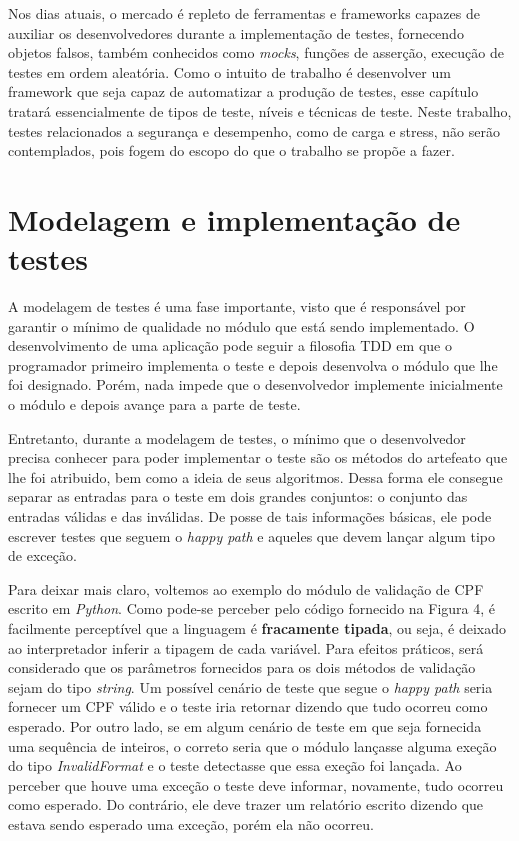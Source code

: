 \documentclass[
    12pt,       %
    openright,      %
    twoside,      %
    a4paper,      %
    english,      %
    french,       %
    spanish,      %
    brazil,       %
    ]{abntex2}
\begin{document}
      Nos dias atuais, o mercado é repleto de ferramentas e frameworks capazes de
      auxiliar os desenvolvedores durante a implementação de testes, fornecendo
      objetos falsos, também conhecidos como \textit{mocks}, funções de asserção,
      execução de testes em ordem aleatória. Como o intuito de trabalho é desenvolver
      um framework que seja capaz de automatizar a produção de testes, esse capítulo
      tratará essencialmente de tipos de teste, níveis e técnicas de teste. Neste trabalho,
      testes relacionados a segurança e desempenho, como de carga e stress, não serão
      contemplados, pois fogem do escopo do que o trabalho se propõe a fazer.

      \section{Modelagem e implementação de testes}
          A modelagem de testes é uma fase importante, visto que é responsável
          por garantir o mínimo de qualidade no módulo que está sendo implementado.
          O desenvolvimento de uma aplicação pode seguir a filosofia TDD em que o
          programador primeiro implementa o teste e depois desenvolva o módulo que
          lhe foi designado. Porém, nada impede que o desenvolvedor implemente
          inicialmente o módulo e depois avançe para a parte de teste.

          Entretanto, durante a modelagem de testes, o mínimo que o desenvolvedor precisa
          conhecer para poder implementar o teste são os métodos do artefeato que
          lhe foi atribuido, bem como a ideia de seus algoritmos. Dessa forma ele
          consegue separar as entradas para o teste em dois grandes conjuntos: o
          conjunto das entradas válidas e das inválidas. De posse de tais informações
          básicas, ele pode escrever testes que seguem o \textit{happy path} e aqueles
          que devem lançar algum tipo de exceção.

          Para deixar mais claro, voltemos ao exemplo do módulo de validação de CPF
          escrito em \textit{Python}. Como pode-se perceber pelo código fornecido na
          Figura 4, é facilmente perceptível que a linguagem é \textbf{fracamente tipada},
          ou seja, é deixado ao interpretador inferir a tipagem de cada variável. Para
          efeitos práticos, será considerado que os parâmetros fornecidos para os dois
          métodos de validação sejam do tipo \textit{string}. Um possível cenário de teste
          que segue o \textit{happy path} seria fornecer um CPF válido e o teste iria
          retornar dizendo que tudo ocorreu como esperado. Por outro lado, se em algum
          cenário de teste em que seja fornecida uma sequência de inteiros, o correto
          seria que o módulo lançasse alguma exeção do tipo \textit{InvalidFormat} e o
          teste detectasse que essa exeção foi lançada. Ao perceber que houve uma exceção
          o teste deve informar, novamente, tudo ocorreu como esperado. Do contrário, ele
          deve trazer um relatório escrito dizendo que estava sendo esperado uma exceção,
          porém ela não ocorreu.
\end{document}
